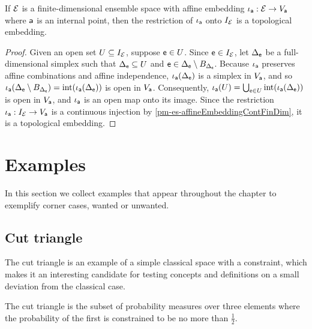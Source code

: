 \begin{mathSection}
	\begin{coro}
		If $\Ens$ is a finite-dimensional ensemble space with affine embedding $\iota_{\ens[a]} : \Ens \to V_{\ens[a]}$ where $\ens[a]$ is an internal point, then the restriction of $\iota_{\ens[a]}$ onto $I_{\Ens}$ is a topological embedding.
	\end{coro}
	
	\begin{proof}
		Given an open set $U \subseteq I_{\Ens}$, suppose $\ens[e] \in U$. Since $\ens[e] \in I_{\Ens}$, let $\Delta_{\ens[e]}$ be a full-dimensional simplex such that $\Delta_{\ens[e]} \subseteq U$ and $\ens[e] \in \Delta_{\ens[e]} \setminus B_{\Delta_{\ens[e]}}$. Because $\iota_{\ens[a]}$ preserves affine combinations and affine independence, $\iota_{\ens[a]}(\Delta_{\ens[e]})$ is a simplex in $V_{\ens[a]}$, and so $\iota_{\ens[a]}(\Delta_{\ens[e]} \setminus B_{\Delta_{\ens[e]}}) = \interior(\iota_{\ens[a]}(\Delta_{\ens[e]}))$ is open in $V_{\ens[a]}$. Consequently, $\iota_{\ens[a]}(U) = \bigcup_{\ens[e] \in U} \interior(\iota_{\ens[a]}(\Delta_{\ens[e]}))$ is open in $V_{\ens[a]}$, and $\iota_{\ens[a]}$ is an open map onto its image. Since the restriction $\iota_{\ens[a]} : I_{\Ens} \to V_{\ens[a]}$ is a continuous injection by \ref{pm-es-affineEmbeddingContFinDim}, it is a topological embedding.
	\end{proof}
\end{mathSection}


\section{Examples}

In this section we collect examples that appear throughout the chapter to exemplify corner cases, wanted or unwanted.

\subsection{Cut triangle}

The cut triangle is an example of a simple classical space with a constraint, which makes it an interesting candidate for testing concepts and definitions on a small deviation from the classical case.

\begin{example}\label{pm-es-cutTriangle}
	The cut triangle is the subset of probability measures over three elements where the probability of the first is constrained to be no more than $\frac{1}{2}$.
\end{example}


